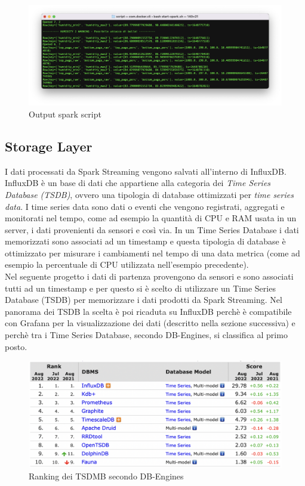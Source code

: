 \documentclass{article}
\begin{document}
\begin{figure}[H]
\includegraphics[width=1\linewidth]{Output-spark-2}
\centering
\caption*{Output spark script}
\label{fig:bytepost}
\end{figure}


 
\subsection{Storage Layer}
I dati processati da Spark Streaming vengono salvati all'interno di InfluxDB. 
InfluxDB è un base di dati che appartiene alla categoria dei \textit{Time Series Database (TSDB)}, ovvero una tipologia di database ottimizzati per \textit{time series data}. I time series data sono dati o eventi che vengono registrati, aggregati e monitorati nel tempo, come ad esempio la quantità di CPU e RAM usata in un server, i dati provenienti da sensori e così via.
In un Time Series Database i dati memorizzati sono associati ad un timestamp e questa tipologia di database è ottimizzato per misurare i cambiamenti nel tempo di una data metrica (come ad esempio la percentuale di CPU utilizzata nell'esempio precedente).\\
Nel seguente progetto i dati di partenza provengono da sensori e sono associati tutti ad un timestamp e per questo si è scelto di utilizzare un Time Series Database (TSDB) per memorizzare i dati prodotti da Spark Streaming.
Nel panorama dei TSDB la scelta è poi ricaduta su InfluxDB perchè è compatibile con Grafana per la visualizzazione dei dati (descritto nella sezione successiva) e perchè tra i Time Series Database, secondo DB-Engines, si classifica al primo posto.

\begin{figure}[H]
\includegraphics[width=1\linewidth]{Database-Rank}
\centering
\caption*{Ranking dei TSDMB secondo DB-Engines}
\label{fig:bytepost}
\end{figure}
\end{document}
